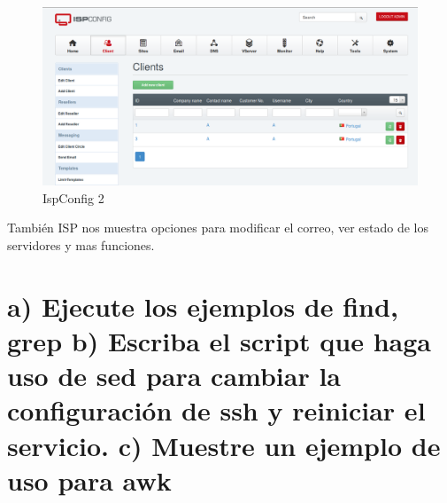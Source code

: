 	\begin{figure}[H]
	\centering
	\includegraphics[scale=0.35]{pics/ejemplo_2.png}  
	\caption{IspConfig 2} \label{fig:isp_config2}
	\end{figure}

También ISP nos muestra opciones para modificar el correo, ver estado de los servidores y mas funciones.



\section[Cuestión 15]{a) Ejecute los ejemplos de find, grep b) Escriba el script que haga uso de sed para cambiar la configuración de ssh y reiniciar el servicio. c) Muestre un ejemplo de uso para awk}

